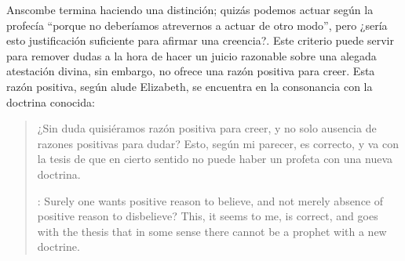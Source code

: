 Anscombe termina haciendo una distinción; quizás podemos actuar según la
profecía \enquote{porque no deberíamos atrevernos a actuar de otro modo}, pero
¿sería esto justificación suficiente para afirmar una creencia?. Este criterio
puede servir para remover dudas a la hora de hacer un juicio razonable sobre una
alegada atestación divina, sin embargo, no ofrece una razón positiva para creer.
Esta razón positiva, según alude Elizabeth, se encuentra en la consonancia con
la doctrina conocida: \blockquote[{\cite[39]{anscombe2008faith:prophandmi}}:
Surely one wants positive reason to believe, and not merely absence of positive
reason to disbelieve? This, it seems to me, is correct, and goes with the thesis
that in some sense there cannot be a prophet with a new doctrine. ]{¿Sin duda
  quisiéramos razón positiva para creer, y no solo ausencia de razones positivas
  para dudar? Esto, según mi parecer, es correcto, y va con la tesis de que en
  cierto sentido no puede haber un profeta con una nueva doctrina.}
